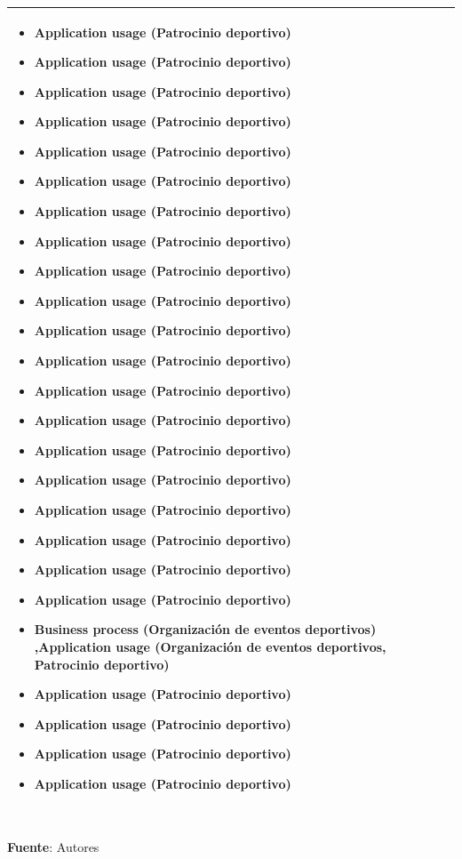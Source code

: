 \begin{table}[!htb]
\begin{center}
{\begin{tabular}{|p{7cm}|p{4cm}|}
\begin{itemize}
				\item Application usage (Patrocinio deportivo)
				\item Application usage (Patrocinio deportivo)
				\item Application usage (Patrocinio deportivo)
				\item Application usage (Patrocinio deportivo)
				\item Application usage (Patrocinio deportivo)
				\item Application usage (Patrocinio deportivo)
				\item Application usage (Patrocinio deportivo)
				\item Application usage (Patrocinio deportivo)
				\item Application usage (Patrocinio deportivo)
				\item Application usage (Patrocinio deportivo)
				\item Application usage (Patrocinio deportivo)
				\item Application usage (Patrocinio deportivo)
				\item Application usage (Patrocinio deportivo)
				\item Application usage (Patrocinio deportivo)
				\item Application usage (Patrocinio deportivo)
				\item Application usage (Patrocinio deportivo)
				\item Application usage (Patrocinio deportivo)
				\item Application usage (Patrocinio deportivo)
				\item Application usage (Patrocinio deportivo)
				\item Application usage (Patrocinio deportivo)
				\item Business process (Organización de eventos deportivos) ,Application usage (Organización de eventos deportivos, Patrocinio deportivo)
				\item Application usage (Patrocinio deportivo)
				\item Application usage (Patrocinio deportivo)
				\item Application usage (Patrocinio deportivo)
				\item Application usage (Patrocinio deportivo)
			\end{itemize} 
			\\
			\hline
		\end{tabular}
		} \\
		\textbf{Fuente}: Autores
	\end{center}
\end{table}

